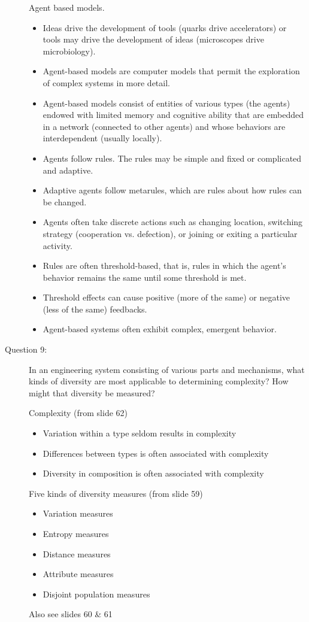 \documentclass[letterpaper,10pt]{article}
\begin{document}
\begin{description}
Agent based models.
\begin{itemize}
  \item Ideas drive the development of tools (quarks drive accelerators) or tools may drive the development of ideas (microscopes drive microbiology).
  \item Agent-based models are computer models that permit the exploration of complex systems in more detail.
  \item Agent-based models consist of entities of various types (the agents) endowed with limited memory and cognitive ability that are embedded in a network (connected to other agents) and whose behaviors are interdependent (usually locally).
  \item Agents follow rules.  The rules may be simple and fixed or complicated and adaptive.
  \item Adaptive agents follow metarules, which are rules about how rules can be changed.
  \item Agents often take discrete actions such as changing location, switching strategy (cooperation vs. defection), or joining or exiting a particular activity.
  \item Rules are often threshold-based, that is, rules in which the agent’s behavior remains the same until some threshold is met.
  \item Threshold effects can cause positive (more of the same) or negative (less of the same) feedbacks.
  \item Agent-based systems often exhibit complex, emergent behavior.
\end{itemize}


\item[Question 9:]
In an engineering system consisting of various parts and mechanisms, what kinds of diversity are most applicable to determining complexity?  How might that diversity be measured?

Complexity (from slide 62)
\begin{itemize}
  \item Variation within a type seldom results in complexity
  \item Differences between types is often associated with complexity
  \item Diversity in composition is often associated with complexity
\end{itemize}

Five kinds of diversity measures (from slide 59)
\begin{itemize}
  \item Variation measures
  \item Entropy measures
  \item Distance measures
  \item Attribute measures
  \item Disjoint population measures
\end{itemize}
Also see slides 60 \& 61


\end{description}
\end{document}
